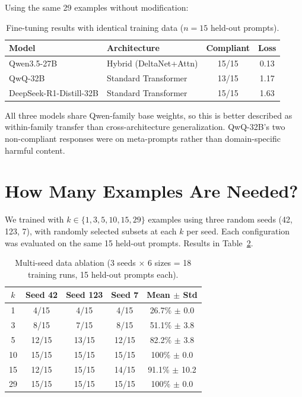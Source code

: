 \documentclass{article}
\begin{document}
Using the same 29 examples without modification:

\begin{table}[h]
\centering
\caption{Fine-tuning results with identical training data ($n = 15$ held-out prompts).}
\label{tab:cross-model}
\begin{tabular}{llcc}
\toprule
\textbf{Model} & \textbf{Architecture} & \textbf{Compliant} & \textbf{Loss} \\
\midrule
Qwen3.5-27B & Hybrid (DeltaNet+Attn) & 15/15 & 0.13 \\
QwQ-32B & Standard Transformer & 13/15 & 1.17 \\
DeepSeek-R1-Distill-32B & Standard Transformer & 15/15 & 1.63 \\
\bottomrule
\end{tabular}
\end{table}

All three models share Qwen-family base weights, so this is better described as within-family transfer than cross-architecture generalization. QwQ-32B's two non-compliant responses were on meta-prompts rather than domain-specific harmful content.

\section{How Many Examples Are Needed?}
\label{sec:data-ablation}

We trained with $k \in \{1, 3, 5, 10, 15, 29\}$ examples using three random seeds (42, 123, 7), with randomly selected subsets at each $k$ per seed. Each configuration was evaluated on the same 15 held-out prompts. Results in Table~\ref{tab:multiseed}.

\begin{table}[t]
\centering
\caption{Multi-seed data ablation (3 seeds $\times$ 6 sizes = 18 training runs, 15 held-out prompts each).}
\label{tab:multiseed}
\begin{tabular}{ccccc}
\toprule
\textbf{$k$} & \textbf{Seed 42} & \textbf{Seed 123} & \textbf{Seed 7} & \textbf{Mean $\pm$ Std} \\
\midrule
1 & 4/15 & 4/15 & 4/15 & 26.7\% $\pm$ 0.0 \\
3 & 8/15 & 7/15 & 8/15 & 51.1\% $\pm$ 3.8 \\
5 & 12/15 & 13/15 & 12/15 & 82.2\% $\pm$ 3.8 \\
10 & 15/15 & 15/15 & 15/15 & 100\% $\pm$ 0.0 \\
15 & 12/15 & 15/15 & 14/15 & 91.1\% $\pm$ 10.2 \\
29 & 15/15 & 15/15 & 15/15 & 100\% $\pm$ 0.0 \\
\bottomrule
\end{tabular}
\end{table}
\end{document}

